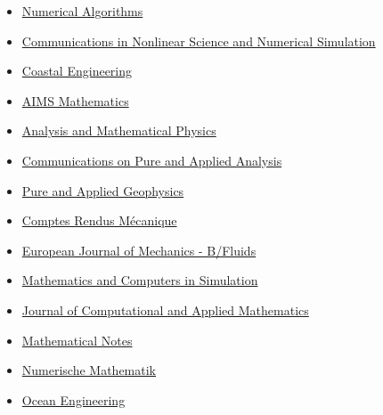 \documentclass[final, a4paper, oneside, 12pt]{article}
\numberwithin{equation}{section}
\begin{document}
\begin{itemize}
    \item \href{http://www.springerlink.com/content/101751/}%
    {Numerical Algorithms}
    
    \item \href{http://www.journals.elsevier.com/communications-in-nonlinear-science-and-numerical-simulation}%
    {Communications in Nonlinear Science and Numerical Simulation}

    \item \href{https://www.sciencedirect.com/journal/coastal-engineering/}%
    {Coastal Engineering}

    \item \href{https://www.aimspress.com/journal/Math/}%
    {AIMS Mathematics}

    \item \href{https://link.springer.com/journal/13324/}%
    {Analysis and Mathematical Physics}
   
    \item \href{http://aimsciences.org/journals/cpaa/}%
    {Communications on Pure and Applied Analysis}

    \item \href{https://www.springer.com/journal/24}%
    {Pure and Applied Geophysics}
    
    \item \href{http://www.sciencedirect.com/science/journal/16310721}%
    {Comptes Rendus M\'ecanique}
    
    \item  \href{http://www.elsevier.com/wps/find/journaldescription.cws_home/600738/description}%
    {European Journal of Mechanics - B/Fluids}
    
    \item \href{http://www.elsevier.com/wps/find/journaldescription.cws_home/505615/description#description}%
    {Mathematics and Computers in Simulation}

    \item \href{https://www.sciencedirect.com/journal/journal-of-computational-and-applied-mathematics/}%
    {Journal of Computational and Applied Mathematics}

    \item \href{https://link.springer.com/journal/11006/}{Mathematical Notes}
    
    \item \href{http://www.springerlink.com/content/100497/}%
    {Numerische Mathematik}
    
    \item \href{http://www.journals.elsevier.com/ocean-engineering/}%
    {Ocean Engineering}


\end{itemize}
\end{document}
